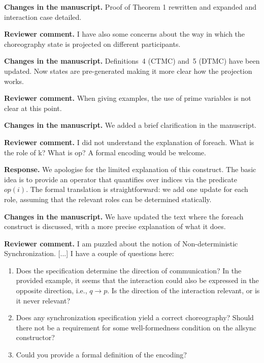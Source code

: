 \documentclass[11pt]{article}
\newcommand{\revcomment}[1]{%
  \begin{reviewercomment}
  \textbf{Reviewer comment.} #1
  \end{reviewercomment}
}
\newcommand{\revresponse}[2][]{%
  \par\noindent\textbf{Response.} #1 #2
}
\newcommand{\revchanges}[2][]{%
  \par\noindent\textbf{Changes in the manuscript.} #1
  #2\par\bigskip
}
\begin{document}
\revchanges{ Proof of Theorem 1 rewritten and expanded and interaction
  case detailed.}



\revcomment{
I have also some concerns about the way in which the choreography state is projected on
different participants.
}

\revchanges{ Definitions~4 (CTMC) and~5 (DTMC) have been updated. Now
  states are pre-generated making it more clear how the projection
  works. }


\revcomment{
When giving examples, the use of prime variables is not clear at this point.
}

\revchanges{ We added a brief clarification in the manuscript.  }





\revcomment{
I did not understand the explanation of foreach. What is the role of k? What is op?
A formal encoding would be welcome.
}

\revresponse{
  We apologise for the limited explanation of this construct. The basic idea is to provide an operator that quantifies over indices via the predicate $op(i)$. The formal translation is straightforward: we add one update for each role, assuming that the relevant roles can be determined statically.
}

\revchanges{ We have updated the text where the foreach construct is
  discussed, with a more precise explanation of what it does.  }


\revcomment{ I am puzzled about the notion of Non-deterministic
  Synchronization. [...] I have a couple of questions here:

  \begin{enumerate}
  \item Does the specification determine the direction of
    communication? In the provided example, it seems that the
    interaction could also be expressed in the opposite direction,
    i.e., $q \rightarrow {p}$. Is the direction of the interaction
    relevant, or is it never relevant?
  \item Does any synchronization specification yield a correct
    choreography? Should there not be a requirement for some
    well-formedness condition on the allsync constructor?
  \item Could you provide a formal definition of the encoding?
  \end{enumerate}
}
\end{document}
